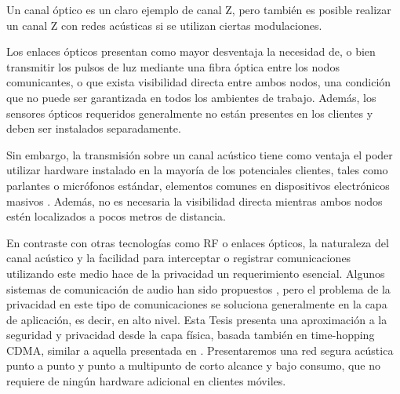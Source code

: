 Un canal óptico es un claro ejemplo de canal Z, pero también es posible realizar un canal Z con redes acústicas si se utilizan ciertas modulaciones.

Los enlaces ópticos presentan como mayor desventaja la necesidad de, o bien transmitir los pulsos de luz mediante una fibra óptica entre los nodos comunicantes, o que exista visibilidad directa entre ambos nodos, una condición que no puede ser garantizada en todos los ambientes de trabajo. Además, los sensores ópticos requeridos generalmente no están presentes en los clientes y deben ser instalados separadamente.

Sin embargo, la transmisión sobre un canal acústico tiene como ventaja el poder utilizar hardware instalado en la mayoría de los potenciales clientes, tales como parlantes o micrófonos estándar, elementos comunes en dispositivos electrónicos masivos \cite{citeulike:12800468}. Además, no es necesaria la visibilidad directa mientras ambos nodos estén localizados a pocos metros de distancia.

En contraste con otras tecnologías como RF o enlaces ópticos, la naturaleza del canal acústico y la facilidad para interceptar o registrar comunicaciones utilizando este medio hace de la privacidad un requerimiento esencial. Algunos sistemas de comunicación de audio han sido propuestos \cite{august2002apparatus}, pero el problema de la privacidad en este tipo de comunicaciones se soluciona generalmente en la capa de aplicación, es decir, en alto nivel. Esta Tesis presenta una aproximación a la seguridad y privacidad desde la capa física, basada también en time-hopping CDMA, similar a aquella presentada en \cite{6476559}. Presentaremos una red segura acústica punto a punto y punto a multipunto de corto alcance y bajo consumo, que no requiere de ningún hardware adicional en clientes móviles.

